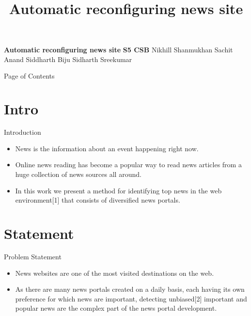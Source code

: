 \documentclass{beamer}
\title{Automatic reconfiguring news site}
\begin{document}
\begin{frame}{}
\centering \textbf{ Automatic reconfiguring news site} \newline \newline
\centering \textbf{S5 CSB} \newline \newline
\centering Nikhill Shanmukhan \newline
\centering Sachit Anand \newline
\centering Siddharth Biju \newline
\centering Sidharth Sreekumar \newline
\end{frame}
	\begin{frame}{Page of Contents}
		\tableofcontents
	\end{frame}
	\section{Intro}
	\begin{frame}{Introduction}
		\begin{itemize}
			\item \Large{News is the information about an event happening right
			now.}
			\item Online news reading has become a popular way to read news articles from a huge collection of news sources all around.
			\item In this work we present a method for identifying top news in the web environment[1] that consists of diversiﬁed news portals. 
		\end{itemize}
	\end{frame}
	\section{Statement}
	\begin{frame}{Problem Statement}
	    \begin{itemize}
	        \item  \Large{News websites are one of the most visited destinations on the web.}
	        \item \Large { As there are many news portals created on a daily basis, each having its own preference for which news are important, detecting unbiased[2] important and popular news are the complex part of the news portal development.}
	    \end{itemize}
	\end{frame}
\end{document}
